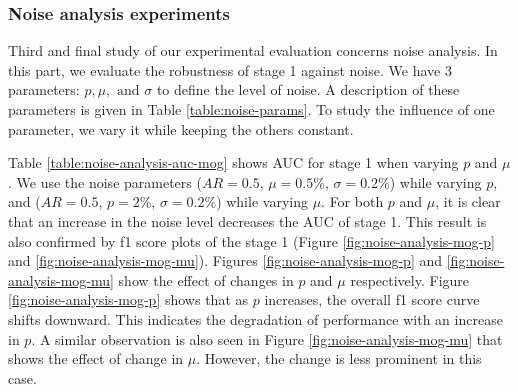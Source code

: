 \vspace{5pt}
\subsubsection{Noise analysis experiments}
Third and final study of our experimental evaluation concerns noise analysis. In this part, we evaluate the robustness of stage 1 against noise. We have 3 parameters: $p, \mu, \text{ and } \sigma$ to define the level of noise. A description of these parameters is given in Table \ref{table:noise-params}. To study the influence of one parameter, we vary it while keeping the others constant. 

Table \ref{table:noise-analysis-auc-mog} shows AUC for stage 1 when varying $p$ and $\mu$. We use the noise parameters ($AR=0.5$, $\mu=0.5\%$, $\sigma=0.2\%$) while varying $p$, and ($AR=0.5$, $p=2\%$, $\sigma=0.2\%$) while varying $\mu$. For both $p$ and $\mu$, it is clear that an increase in the noise level decreases the AUC of stage 1.  This result is also confirmed by f1 score plots of the stage 1 (Figure \ref{fig:noise-analysis-mog-p} and \ref{fig:noise-analysis-mog-mu}). Figures \ref{fig:noise-analysis-mog-p} and \ref{fig:noise-analysis-mog-mu} show the effect of changes in $p$ and $\mu$ respectively. Figure \ref{fig:noise-analysis-mog-p} shows that as $p$ increases, the overall f1 score curve shifts downward. This indicates the degradation of performance with an increase in $p$. A similar observation is also seen in Figure \ref{fig:noise-analysis-mog-mu} that shows the effect of change in $\mu$. However, the change is less prominent in this case.  


